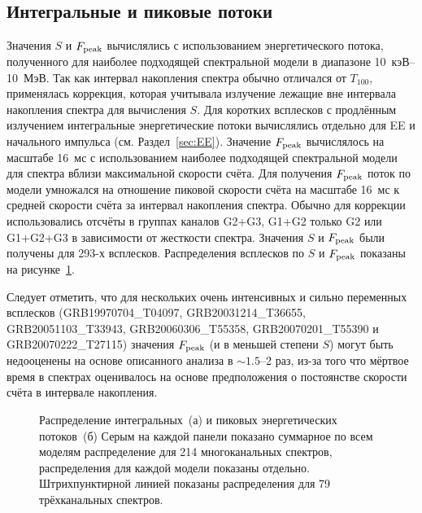 

\subsection{Интегральные и пиковые потоки}
Значения $S$ и $F_{\mathrm{peak}}$ вычислялись с использованием энергетического потока,
полученного для наиболее подходящей спектральной модели в диапазоне 10~кэВ--10~МэВ.
Так как интервал накопления спектра обычно отличался от $T_{100}$, применялась 
коррекция, которая учитывала излучение лежащие вне интервала накопления спектра 
для вычисления $S$.
Для коротких всплесков с продлённым излучением интегральные энергетические потоки 
вычислялись отдельно для EE и начального импульса (см. Раздел~\ref{sec:EE}).
Значение $F_{\mathrm{peak}}$ вычислялось на масштабе 16~мс с использованием наиболее 
подходящей спектральной модели для спектра вблизи максимальной скорости счёта.
Для получения $F_{\mathrm{peak}}$ поток по модели умножался на отношение 
пиковой скорости счёта на масштабе 16~мс к средней скорости счёта за интервал 
накопления спектра. Обычно для коррекции использовались отсчёты в группах каналов
G2+G3, G1+G2 только G2 или G1+G2+G3 в зависимости от жесткости спектра.
Значения $S$ и $F_{\mathrm{peak}}$ были получены для 293-х всплесков.
Распределения всплесков по $S$ и $F_{\mathrm{peak}}$ показаны на рисунке~\ref{fig:fl_pf_dist}.

Следует отметить, что для нескольких очень интенсивных и сильно переменных всплесков 
(GRB19970704\_T04097, GRB20031214\_T36655, GRB20051103\_T33943, GRB20060306\_T55358,
GRB20070201\_T55390 и GRB20070222\_T27115)
значения $F_{\mathrm{peak}}$ (и в меньшей степени $S$) могут быть недооценены на основе описанного анализа
в $\sim1.5$--2 раз, из-за того что мёртвое время в спектрах оценивалось на основе предположения о 
постоянстве скорости счёта в интервале накопления.

\begin{figure}
    \begin{minipage}[h]{0.5\textwidth}
    \end{minipage}
    \hfill
    \begin{minipage}[h]{0.5\textwidth}
	\end{minipage}
\caption{
    Распределение интегральных~(а) и пиковых энергетических потоков~(б)
    Серым на каждой панели показано суммарное по всем моделям распределение для 214
    многоканальных спектров, распределения для каждой модели показаны отдельно. 
    Штрихпунктирной линией показаны распределения для 79 трёхканальных спектров.
    \label{fig:fl_pf_dist} }
\end{figure}

